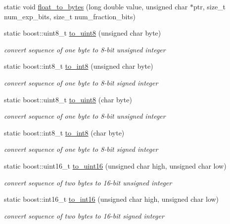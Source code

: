\begin{DoxyCompactItemize}
\item 
static void \hyperlink{structpion_1_1algorithm_a61872c7ccf75793a16d8ce7961f28842}{float\-\_\-to\-\_\-bytes} (long double value, unsigned char $\ast$ptr, size\-\_\-t num\-\_\-exp\-\_\-bits, size\-\_\-t num\-\_\-fraction\-\_\-bits)
\item 
static boost\-::uint8\-\_\-t \hyperlink{structpion_1_1algorithm_a79898e00c20439125c68d90248afb2e0}{to\-\_\-uint8} (unsigned char byte)
\begin{DoxyCompactList}\small\item\em convert sequence of one byte to 8-\/bit unsigned integer \end{DoxyCompactList}\item 
static boost\-::int8\-\_\-t \hyperlink{structpion_1_1algorithm_afb09388ae577897cd3fac5572c9e4eef}{to\-\_\-int8} (unsigned char byte)
\begin{DoxyCompactList}\small\item\em convert sequence of one byte to 8-\/bit signed integer \end{DoxyCompactList}\item 
static boost\-::uint8\-\_\-t \hyperlink{structpion_1_1algorithm_a6088634700c44316b7d6d55e687d65aa}{to\-\_\-uint8} (char byte)
\begin{DoxyCompactList}\small\item\em convert sequence of one byte to 8-\/bit unsigned integer \end{DoxyCompactList}\item 
static boost\-::int8\-\_\-t \hyperlink{structpion_1_1algorithm_a8a891be43c16371c9cf9447224f1705c}{to\-\_\-int8} (char byte)
\begin{DoxyCompactList}\small\item\em convert sequence of one byte to 8-\/bit signed integer \end{DoxyCompactList}\item 
static boost\-::uint16\-\_\-t \hyperlink{structpion_1_1algorithm_aa755b157b2cda061aec92c49b7ee9dac}{to\-\_\-uint16} (unsigned char high, unsigned char low)
\begin{DoxyCompactList}\small\item\em convert sequence of two bytes to 16-\/bit unsigned integer \end{DoxyCompactList}\item 
static boost\-::int16\-\_\-t \hyperlink{structpion_1_1algorithm_a32a9690172523ef7c558f92b319429c9}{to\-\_\-int16} (unsigned char high, unsigned char low)
\begin{DoxyCompactList}\small\item\em convert sequence of two bytes to 16-\/bit signed integer \end{DoxyCompactList}\item 

\end{DoxyCompactItemize}
